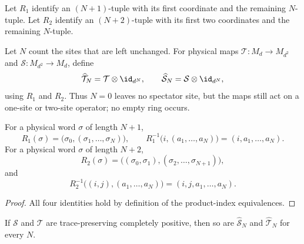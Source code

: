 \begin{definition}
    \label{def:finite_tuple_regroupings}
    \leanok
    Let $R_1$ identify an $(N+1)$-tuple with its first coordinate and the
    remaining $N$-tuple.  Let $R_2$ identify an $(N+2)$-tuple with its first
    two coordinates and the remaining $N$-tuple.
\end{definition}

\begin{definition}
    \label{def:mpdo_global_renormalization_maps}
    \leanok
    Let $N$ count the sites that are left unchanged.  For physical maps
    $\mathcal T:M_d\to M_{d^2}$ and $\mathcal S:M_{d^2}\to M_d$, define
    \[
       \widehat{\mathcal T}_N
       =\mathcal T\otimes\id_{d^N},
       \qquad
       \widehat{\mathcal S}_N
       =\mathcal S\otimes\id_{d^N},
    \]
    using $R_1$ and $R_2$.  Thus $N=0$ leaves no spectator site, but the
    maps still act on a one-site or two-site operator; no empty ring occurs.
\end{definition}

\begin{lemma}
    \label{lem:mpdo_global_renormalization_regrouping}
    \leanok
    For a physical word $\sigma$ of length $N+1$,
    \[
      R_1(\sigma)=\bigl(\sigma_0,(\sigma_1,\ldots,\sigma_N)\bigr),
      \qquad
      R_1^{-1}\bigl(i,(a_1,\ldots,a_N)\bigr)=(i,a_1,\ldots,a_N).
    \]
    For a physical word $\sigma$ of length $N+2$,
    \[
      R_2(\sigma)
        =\bigl((\sigma_0,\sigma_1),(\sigma_2,\ldots,\sigma_{N+1})\bigr),
    \]
    and
    \[
      R_2^{-1}\bigl((i,j),(a_1,\ldots,a_N)\bigr)
        =(i,j,a_1,\ldots,a_N).
    \]
\end{lemma}

\begin{proof}
    \leanok
    All four identities hold by definition of the product-index equivalences.
\end{proof}

\begin{lemma}
    \label{lem:mpdo_global_renormalization_maps_cptp}
    \leanok
    If $\mathcal S$ and $\mathcal T$ are trace-preserving completely positive,
    then so are $\widehat{\mathcal S}_N$ and
    $\widehat{\mathcal T}_N$ for every $N$.
\end{lemma}

